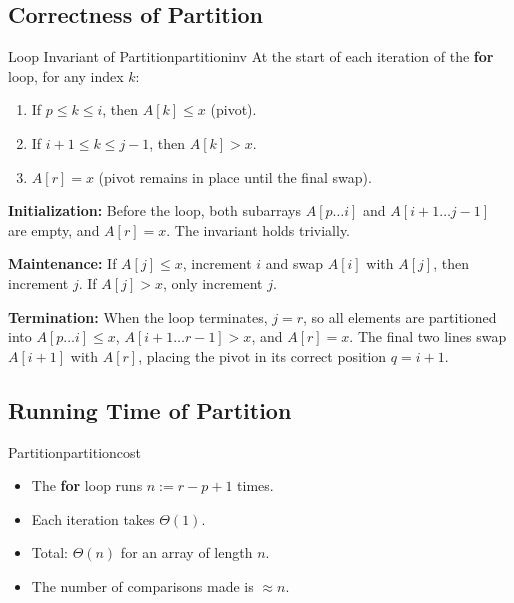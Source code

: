 \subsection{Correctness of Partition}

\begin{theorem}{Loop Invariant of Partition}{partitioninv}
At the start of each iteration of the \textbf{for} loop, for any index $k$:
\begin{enumerate}[noitemsep]
  \item If $p \le k \le i$, then $A[k] \le x$ (pivot).
  \item If $i+1 \le k \le j-1$, then $A[k] > x$.
  \item $A[r] = x$ (pivot remains in place until the final swap).
\end{enumerate}

\textbf{Initialization:} Before the loop, both subarrays $A[p \ldots i]$ and
$A[i+1 \ldots j-1]$ are empty, and $A[r] = x$. The invariant holds trivially.

\textbf{Maintenance:} If $A[j] \le x$, increment $i$ and swap $A[i]$ with $A[j]$, then
increment $j$. If $A[j] > x$, only increment $j$.

\textbf{Termination:} When the loop terminates, $j = r$, so all elements are partitioned
into $A[p \ldots i] \le x$, $A[i+1 \ldots r-1] > x$, and $A[r] = x$. The final two lines
swap $A[i+1]$ with $A[r]$, placing the pivot in its correct position $q = i+1$.
\end{theorem}

\subsection{Running Time of Partition}

\begin{complexity}{Partition}{partitioncost}
\begin{itemize}[noitemsep]
  \item The \textbf{for} loop runs $n := r - p + 1$ times.
  \item Each iteration takes $\Theta(1)$.
  \item Total: $\Theta(n)$ for an array of length $n$.
  \item The number of comparisons made is $\approx n$.
\end{itemize}
\end{complexity}

